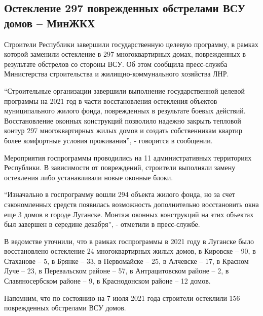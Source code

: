  
 
 
 
 
\subsection{Остекление 297 поврежденных обстрелами ВСУ домов – МинЖКХ}
\label{sec:14_12_2021.stz.news.lnr.lug_info.3.stroiteli_doma_osteklenie}


Строители Республики завершили государственную целевую программу, в рамках
которой заменили остекление в 297 многоквартирных домах, поврежденных в
результате обстрелов со стороны ВСУ. Об этом сообщила пресс-служба Министерства
строительства и жилищно-коммунального хозяйства ЛНР.

\enquote{Строительные организации завершили выполнение государственной целевой
программы на 2021 год в части восстановления остекления объектов муниципального
жилого фонда, поврежденных в результате боевых действий. Восстановление оконных
конструкций позволило надежно закрыть тепловой контур 297 многоквартирных жилых
домов и создать собственникам квартир более комфортные условия проживания}, -
говорится в сообщении.

Мероприятия госпрограммы проводились на 11 административных территориях
Республики. В зависимости от повреждений, строители выполняли замену остекления
либо устанавливали новые оконные блоки.

\enquote{Изначально в госпрограмму вошли 294 объекта жилого фонда, но за счет
сэкономленных средств появилась возможность дополнительно восстановить окна еще
3 домов в городе Луганске. Монтаж оконных конструкций на этих объектах был
завершен в середине декабря}, - отметили в пресс-службе.

В ведомстве уточнили, что в рамках госпрограммы в 2021 году в Луганске было
восстановлено остекление 24 многоквартирных жилых домов, в Кировске – 90, в
Стаханове – 5, в Брянке – 33, в Первомайске – 25, в Алчевске – 17, в Красном
Луче – 23, в Перевальском районе – 57, в Антрацитовском районе – 2, в
Славяносербском районе – 9, в Краснодонском районе – 12 домов.  

Напомним, что по состоянию на 7 июля 2021 года строители остеклили 156
поврежденных обстрелами ВСУ домов.
